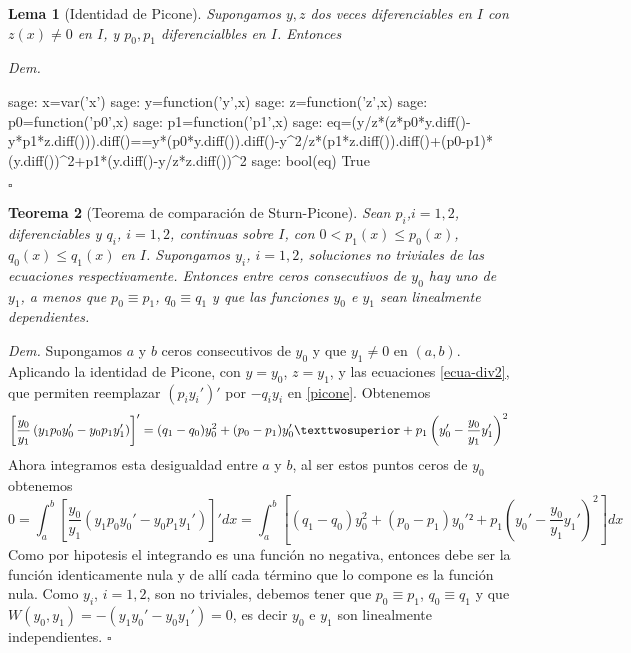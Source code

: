 \documentclass{article}
\newenvironment{demo}{\noindent\emph{Dem.}}{{\hspace*{\fill}$\square$} \newline\vspace{5pt}}
\newtheorem{teorema}{Teorema}[section]
\newtheorem{lema}[teorema]{Lema}
\begin{document}
\begin{lema}[Identidad de Picone] Supongamos $y,z$ dos veces diferenciables en $I$ con $z(x)\neq 0$ en $I$, y $p_0,p_1$ diferencialbles en $I$. Entonces
\end{lema}
\begin{demo} 
\begin{sagecommandline}
sage: x=var('x')
sage: y=function('y',x)
sage: z=function('z',x)
sage: p0=function('p0',x)
sage: p1=function('p1',x)
sage: eq=(y/z*(z*p0*y.diff()-y*p1*z.diff())).diff()==y*(p0*y.diff()).diff()-y^2/z*(p1*z.diff()).diff()+(p0-p1)*(y.diff())^2+p1*(y.diff()-y/z*z.diff())^2
sage: bool(eq)
True
\end{sagecommandline}
\end{demo}
\begin{teorema}[Teorema de comparación de Sturn-Picone] Sean $p_i$,$i=1,2$,  diferenciables y $q_i$, $i=1,2$, continuas sobre $I$, con $0<p_1(x)\leq p_0(x)$, $q_0(x)\leq q_1(x)$ en $I$.  Supongamos $y_i$, $i=1,2$, soluciones no triviales de las ecuaciones 
respectivamente.  Entonces entre ceros consecutivos de $y_0$ hay uno de $y_1$, a menos que $p_0\equiv p_1$, $q_0\equiv q_1$ y que las funciones $y_0$ e $y_1$ sean linealmente dependientes. 
\end{teorema}
\begin{demo} Supongamos $a$ y $b$ ceros consecutivos de $y_0$ y que $y_1\neq 0$ en $(a,b)$. Aplicando la identidad de Picone, con $y=y_0$, $z=y_1$, y las ecuaciones \eqref{ecua-div2}, que permiten reemplazar $(p_iy_i')'$ por $-q_iy_i$ en  \eqref{picone}. Obtenemos
\[\left[\frac{y_0}{y_1}\left(y_1p_0y_0'-y_0p_1y_1' \right) \right]'=
  (q_1-q_0)y_0^2+(p_0-p_1)y_0'²+p_1\left(y_0'-\frac{y_0}{y_1}y_1'\right)^2\\
\]
Ahora integramos esta desigualdad entre $a$ y $b$, al ser estos puntos ceros de $y_0$ obtenemos
\[0=\int_a^b\left[\frac{y_0}{y_1}\left(y_1p_0y_0'-y_0p_1y_1' \right) \right]'dx=
\int_a^b\left[
  (q_1-q_0)y_0^2+(p_0-p_1)y_0'²+p_1\left(y_0'-\frac{y_0}{y_1}y_1'\right)^2\right]dx\]
Como por hipotesis el integrando es una función no negativa, entonces debe ser la función identicamente nula y de allí cada término que lo compone es la función nula. Como $y_i$, $i=1,2$, son no triviales, debemos tener que   $p_0\equiv p_1$, $q_0\equiv q_1$ y que $W(y_0,y_1)=-(y_1y_0'-y_0y_1')=0$, es decir $y_0$ e $y_1$ son linealmente independientes.
\end{demo}
\end{document}
